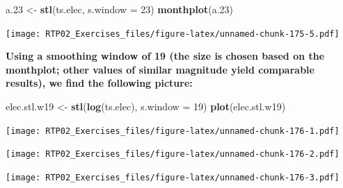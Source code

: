 \documentclass[
]{article}
\newenvironment{Shaded}{\begin{snugshade}}{\end{snugshade}}
\newcommand{\DataTypeTok}[1]{\textcolor[rgb]{0.13,0.29,0.53}{#1}}
\newcommand{\DecValTok}[1]{\textcolor[rgb]{0.00,0.00,0.81}{#1}}
\newcommand{\FloatTok}[1]{\textcolor[rgb]{0.00,0.00,0.81}{#1}}
\newcommand{\KeywordTok}[1]{\textcolor[rgb]{0.13,0.29,0.53}{\textbf{#1}}}
\newcommand{\NormalTok}[1]{#1}
\newcommand{\OperatorTok}[1]{\textcolor[rgb]{0.81,0.36,0.00}{\textbf{#1}}}
\newcommand{\StringTok}[1]{\textcolor[rgb]{0.31,0.60,0.02}{#1}}
\begin{document}
\begin{Shaded}
\begin{Highlighting}[]
\NormalTok{a}\FloatTok{.23}\NormalTok{ <-}\StringTok{ }\KeywordTok{stl}\NormalTok{(ts.elec, }\DataTypeTok{s.window =} \DecValTok{23}\NormalTok{)}
\KeywordTok{monthplot}\NormalTok{(a}\FloatTok{.23}\NormalTok{)}
\end{Highlighting}
\end{Shaded}

\texttt{[image: RTP02\_Exercises\_files/figure-latex/unnamed-chunk-175-5.pdf]}

\textbf{Using a smoothing window of 19 (the size is chosen based on the
monthplot; other values of similar magnitude yield comparable results),
we find the following picture:}

\begin{Shaded}
\begin{Highlighting}[]
\NormalTok{elec.stl.w19 <-}\StringTok{ }\KeywordTok{stl}\NormalTok{(}\KeywordTok{log}\NormalTok{(ts.elec), }\DataTypeTok{s.window =} \DecValTok{19}\NormalTok{)}
\KeywordTok{plot}\NormalTok{(elec.stl.w19)}
\end{Highlighting}
\end{Shaded}

\texttt{[image: RTP02\_Exercises\_files/figure-latex/unnamed-chunk-176-1.pdf]}

\begin{Shaded}
\end{Shaded}

\texttt{[image: RTP02\_Exercises\_files/figure-latex/unnamed-chunk-176-2.pdf]}

\begin{Shaded}
\end{Shaded}

\texttt{[image: RTP02\_Exercises\_files/figure-latex/unnamed-chunk-176-3.pdf]}
\end{document}
